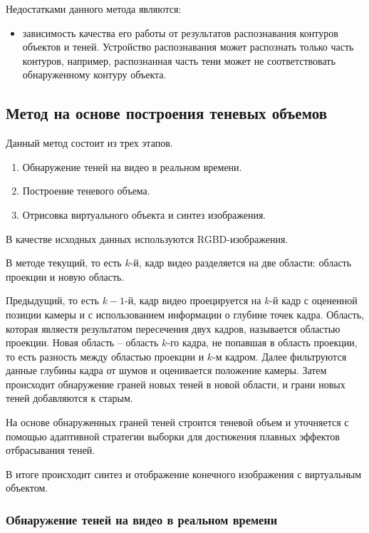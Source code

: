 Недостатками данного метода являются:

\begin{itemize}
	\item зависимость качества его работы от результатов распознавания контуров объектов и теней. Устройство распознавания может распознать только часть контуров, например, распознанная часть тени может не соответствовать обнаруженному контуру объекта.
\end{itemize}

\subsection{Метод на основе построения теневых объемов}

Данный метод состоит из трех этапов.

\begin{enumerate}
	\item Обнаружение теней на видео в реальном времени.
	\item Построение теневого объема.
	\item Отрисовка виртуального объекта и синтез изображения.
\end{enumerate}

В качестве исходных данных используются RGBD-изображения.

В методе текущий, то есть $k$-й, кадр видео разделяется на две области: область проекции и новую область. 

Предыдущий, то есть $k-1$-й, кадр видео проецируется на $k$-й кадр с оцененной позиции камеры и с использованием информации о глубине точек кадра. Область, которая являестя результатом пересечения двух кадров, называется областью проекции. Новая область -- область $k$-го кадра, не попавшая в область проекции, то есть разность между областью проекции и $k$-м кадром. Далее фильтруются данные глубины кадра от шумов и оценивается положение камеры. Затем происходит обнаружение граней новых теней в новой области, и грани новых теней добавляются к старым. 

На основе обнаруженных граней теней строится теневой объем и уточняется с помощью адаптивной стратегии выборки \cite{THOMASIAN2022385} для достижения плавных эффектов отбрасывания теней.

В итоге происходит синтез и отображение конечного изображения с виртуальным объектом.

\subsubsection*{Обнаружение теней на видео в реальном времени}

